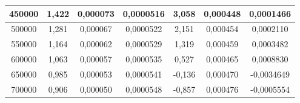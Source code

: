 \begin{table}[!ht]
\begin{tabular}{|c|c|c|c|c|c|c|}
        450000 & 1,422 & 0,000073 & 0,0000516 & 3,058 & 0,000448 & 0,0001466 \\ \hline
        500000 & 1,281 & 0,000067 & 0,0000522 & 2,151 & 0,000454 & 0,0002110 \\ \hline
        550000 & 1,164 & 0,000062 & 0,0000529 & 1,319 & 0,000459 & 0,0003482 \\ \hline
        600000 & 1,063 & 0,000057 & 0,0000535 & 0,527 & 0,000465 & 0,0008830 \\ \hline
        650000 & 0,985 & 0,000053 & 0,0000541 & -0,136 & 0,000470 & -0,0034649 \\ \hline
        700000 & 0,906 & 0,000050 & 0,0000548 & -0,857 & 0,000476 & -0,0005554 \\ \hline
    \end{tabular}
\end{table}